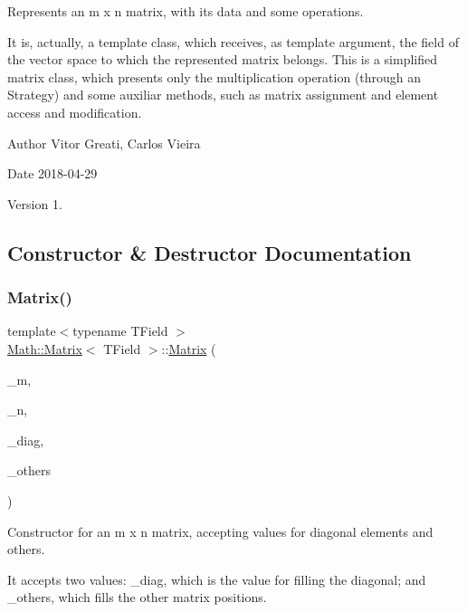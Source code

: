 Represents an m x n matrix, with its data and some operations. 

It is, actually, a template class, which receives, as template argument, the field of the vector space to which the represented matrix belongs. This is a simplified matrix class, which presents only the multiplication operation (through an Strategy) and some auxiliar methods, such as matrix assignment and element access and modification.

\begin{DoxyAuthor}{Author}
Vitor Greati, Carlos Vieira 
\end{DoxyAuthor}
\begin{DoxyDate}{Date}
2018-\/04-\/29 
\end{DoxyDate}
\begin{DoxyVersion}{Version}
1. 
\end{DoxyVersion}


\subsection{Constructor \& Destructor Documentation}
\mbox{\label{classMath_1_1Matrix_a15145cfc26ef1fd2f68e4a4489490e30}} 
\subsubsection{\texorpdfstring{Matrix()}{Matrix()}\hspace{0.1cm}{\footnotesize\ttfamily [1/4]}}
{\footnotesize\ttfamily template$<$typename T\+Field $>$ \\
\mbox{\hyperlink{classMath_1_1Matrix}{Math\+::\+Matrix}}$<$ T\+Field $>$\+::\mbox{\hyperlink{classMath_1_1Matrix}{Matrix}} (\begin{DoxyParamCaption}\item[{const int \&}]{\+\_\+m,  }\item[{const int \&}]{\+\_\+n,  }\item[{const T\+Field \&}]{\+\_\+diag,  }\item[{const T\+Field \&}]{\+\_\+others }\end{DoxyParamCaption})}



Constructor for an m x n matrix, accepting values for diagonal elements and others. 

It accepts two values\+: \+\_\+diag, which is the value for filling the diagonal; and \+\_\+others, which fills the other matrix positions.


